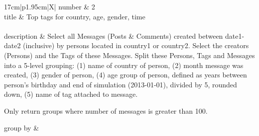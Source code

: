 \renewcommand*{\arraystretch}{1.1}

\noindent\begin{tabularx}{17cm}{|p{1.95cm}|X|}
	\hline
	number      & 2                                                          \\ \hline
%
	title       & Top tags for country, age, gender, time                                                           \\ \hline
	 \\ \hline
	description & Select all Messages (Posts \& Comments) created between date1-date2
(inclusive) by persons located in country1 or country2. Select the
creators (Persons) and the Tags of these Messages. Split these Persons,
Tags and Messages into a 5-level grouping: (1) name of country of
person, (2) month message was created, (3) gender of person, (4) age
group of person, defined as years between person's birthday and end of
simulation (2013-01-01), divided by 5, rounded down, (5) name of tag
attached to message.

Only return groups where number of messages is greater than 100.
 \\ \hline
	
%
	group by       &
	 \\ \hline
	

\end{tabularx}
